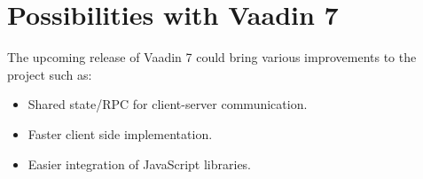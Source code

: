 \section {Possibilities with Vaadin 7}
The upcoming release of Vaadin 7 could bring various improvements to the project such as:
\begin{itemize}
	\item Shared state/RPC for client-server communication.
	\item Faster client side implementation. 
	\item Easier integration of JavaScript libraries.
\end{itemize}
\pagebreak